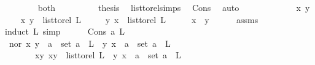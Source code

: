 \begin{isabellebody}
\isanewline
\ \ \ \ \ \ \isamarkupfalse%
\ both\isanewline
\ \ \ \ \ \ \isamarkupfalse%
\ \isamarkupfalse%
\ {\isacharquery}{\kern0pt}thesis\ \isamarkupfalse%
\ list{\isacharunderscore}{\kern0pt}to{\isacharunderscore}{\kern0pt}rel{\isachardot}{\kern0pt}simps{\isacharparenleft}{\kern0pt}{}{\isacharparenright}{\kern0pt}\ \isamarkupfalse%
\ Cons\ \isamarkupfalse%
\ auto\isanewline
\ \ \ \ \isamarkupfalse%
\isanewline
\ \ \isamarkupfalse%
\ \isanewline
{}\isamarkupfalse%
\isanewline
\ \ \isamarkupfalse%
\ x\ y\ \isanewline
\ \ \isamarkupfalse%
\ {\isachardoublequoteopen}{\isacharparenleft}{\kern0pt}x{\isacharcomma}{\kern0pt}\ y{\isacharparenright}{\kern0pt}\ {\isasymin}\ list{\isacharunderscore}{\kern0pt}to{\isacharunderscore}{\kern0pt}rel\ L{\isachardoublequoteclose}\isanewline
\ \ \ \ \ {\isachardoublequoteopen}{\isacharparenleft}{\kern0pt}y{\isacharcomma}{\kern0pt}\ x{\isacharparenright}{\kern0pt}\ {\isasymin}\ list{\isacharunderscore}{\kern0pt}to{\isacharunderscore}{\kern0pt}rel\ L{\isachardoublequoteclose}\isanewline
\ \ \isamarkupfalse%
\ \isamarkupfalse%
\ {\isachardoublequoteopen}x\ {\isacharequal}{\kern0pt}\ y{\isachardoublequoteclose}\isanewline
\ \ \ \ \isamarkupfalse%
\ assms\isanewline
\ \ \isamarkupfalse%
{\isacharparenleft}{\kern0pt}induct\ L{\isacharcomma}{\kern0pt}\ simp{\isacharparenright}{\kern0pt}\isanewline
\ \ \ \ \isamarkupfalse%
\ {\isacharparenleft}{\kern0pt}Cons\ a\ L{\isacharparenright}{\kern0pt}\isanewline
\ \ \ \ \isamarkupfalse%
\ \isamarkupfalse%
\ {\isacharparenleft}{\kern0pt}nor{\isacharparenright}{\kern0pt}\ {\isachardoublequoteopen}{\isacharparenleft}{\kern0pt}x{\isacharcomma}{\kern0pt}\ y{\isacharparenright}{\kern0pt}\ {\isasymin}\ {\isacharbraceleft}{\kern0pt}a{\isacharbraceright}{\kern0pt}\ {\isasymtimes}\ set\ {\isacharparenleft}{\kern0pt}a\ {\isacharhash}{\kern0pt}\ L{\isacharparenright}{\kern0pt}\ {\isasymand}\ {\isacharparenleft}{\kern0pt}y{\isacharcomma}{\kern0pt}\ x{\isacharparenright}{\kern0pt}\ {\isasymin}\ {\isacharbraceleft}{\kern0pt}a{\isacharbraceright}{\kern0pt}\ {\isasymtimes}\ set\ {\isacharparenleft}{\kern0pt}a\ {\isacharhash}{\kern0pt}\ L{\isacharparenright}{\kern0pt}{\isachardoublequoteclose}\ \isanewline
\ \ \ \ \ \ {\isacharbar}{\kern0pt}\ {\isacharparenleft}{\kern0pt}xy{\isacharparenright}{\kern0pt}\ {\isachardoublequoteopen}{\isacharparenleft}{\kern0pt}x{\isacharcomma}{\kern0pt}y{\isacharparenright}{\kern0pt}\ {\isasymin}\ list{\isacharunderscore}{\kern0pt}to{\isacharunderscore}{\kern0pt}rel\ L\ {\isasymand}\ {\isacharparenleft}{\kern0pt}y{\isacharcomma}{\kern0pt}\ x{\isacharparenright}{\kern0pt}\ {\isasymin}\ {\isacharbraceleft}{\kern0pt}a{\isacharbraceright}{\kern0pt}\ {\isasymtimes}\ set\ {\isacharparenleft}{\kern0pt}a\ {\isacharhash}{\kern0pt}\ L{\isacharparenright}{\kern0pt}{\isachardoublequoteclose}\ \isanewline

\end{isabellebody}

